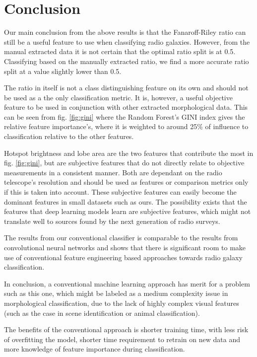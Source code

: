 \documentclass[conference]{IEEEtran}
\begin{document}
\section{Conclusion}

Our main conclusion from the above results is that the Fanaroff-Riley ratio can still be a useful feature to use when classifying radio galaxies. However, from the manual extracted data it is not certain that the optimal ratio split is at 0.5. Classifying based on the manually extracted ratio, we find a more accurate ratio split at a value slightly lower than 0.5.

The ratio in itself is not a class distinguishing feature on its own and should not be used as a the only classification metric. It is, however, a useful objective feature to be used in conjunction with other extracted morphological data. This can be seen from fig. \ref{fig:gini} where the Random Forest's GINI index gives the relative feature importance's, where it is weighted to around 25\% of influence to classification relative to the other features.

Hotspot brightness and lobe area are the two features that contribute the most in fig. \ref{fig:gini}, but are subjective features that do not directly relate to objective measurements in a consistent manner. Both are dependant on the radio telescope's resolution and should be used as features or comparison metrics only if this is taken into account. These subjective features can easily become the dominant features in small datasets such as ours. The possibility exists that the features that deep learning models learn are subjective features, which might not translate well to sources found by the next generation of radio surveys.

The results from our conventional classifier is comparable to the results from convolutional neural networks and shows that there is significant room to make use of conventional feature engineering based approaches towards radio galaxy classification. 

In conclusion, a conventional machine learning approach has merit for a problem such as this one, which might be labeled as a medium complexity issue in morphological classification, due to the lack of highly complex visual features (such as the case in scene identification or animal classification). 

The benefits of the conventional approach is shorter training time, with less risk of overfitting the model, shorter time requirement to retrain on new data and more knowledge of feature importance during classification.
\end{document}
